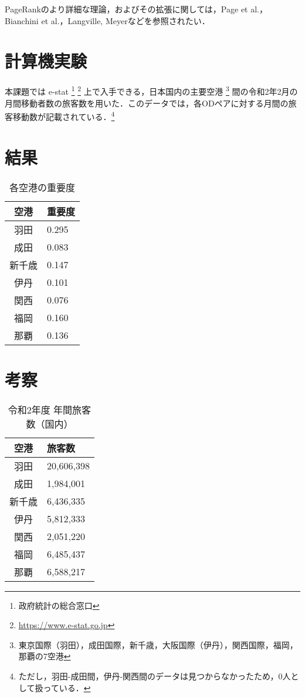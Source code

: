 \documentclass[a4j, dvipdfmx, twocolumn]{jsarticle}
\begin{document}
PageRankのより詳細な理論，およびその拡張に関しては，Page et al.\cite{ilprints422}，Bianchini et al.\cite{bianchini2005inside}，Langville, Meyer\cite{langville2004deeper}などを参照されたい．

\section{計算機実験}
本課題では e-stat
\footnote{政府統計の総合窓口}
\footnote{\url{https://www.e-stat.go.jp}}
上で入手できる，日本国内の主要空港
\footnote{東京国際（羽田），成田国際，新千歳，大阪国際（伊丹），関西国際，福岡，那覇の7空港}
間の令和2年2月の月間移動者数の旅客数を用いた．このデータでは，各ODペアに対する月間の旅客移動数が記載されている．\footnote{ただし，羽田-成田間，伊丹-関西間のデータは見つからなかったため，0人として扱っている．}

\section{結果}


\begin{table}[htb]
    \begin{tabular}{cl}
      \hline
      空港 & 重要度 \\
      \hline
      \hline
      羽田 & 0.295 \\
      成田 & 0.083 \\
      新千歳 & 0.147 \\
      伊丹 & 0.101 \\
      関西 & 0.076 \\
      福岡 & 0.160 \\
      那覇 & 0.136 \\
      \hline
    \end{tabular}
  \centering
  \caption{各空港の重要度}
\end{table}

\section{考察}

\begin{table}[htb]
  \begin{tabular}{cl}
    \hline
    空港 & 旅客数 \\
    \hline
    \hline
    羽田 & 20,606,398 \\
    成田 & 1,984,001 \\
    新千歳 & 6,436,335 \\
    伊丹 & 5,812,333 \\
    関西 & 2,051,220 \\
    福岡 & 6,485,437 \\
    那覇 & 6,588,217 \\
    \hline
  \end{tabular}
\centering
\caption{令和2年度 年間旅客数（国内）}
\end{table}
\end{document}
